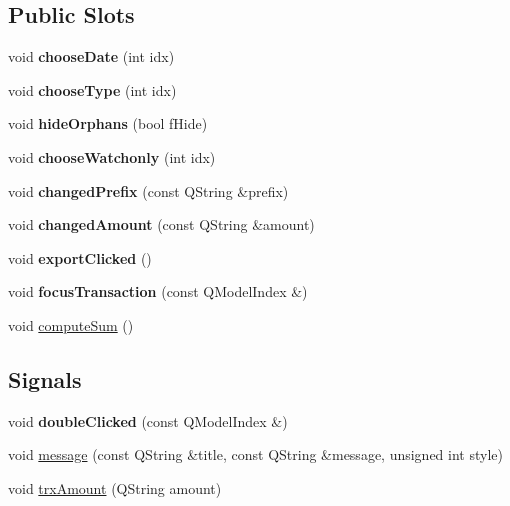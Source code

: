 \subsection*{Public Slots}
\begin{DoxyCompactItemize}
\item 
\mbox{\label{class_transaction_view_abd49a0777b14f7bf5a72a4d5901d033d}} 
void {\bfseries choose\+Date} (int idx)
\item 
\mbox{\label{class_transaction_view_a590f0edc4ab4d59f88d7fc494e852f80}} 
void {\bfseries choose\+Type} (int idx)
\item 
\mbox{\label{class_transaction_view_ab50fad53deb517f68926d62d2ff86a40}} 
void {\bfseries hide\+Orphans} (bool f\+Hide)
\item 
\mbox{\label{class_transaction_view_a0f3b9936adcb622403210e7b38a64574}} 
void {\bfseries choose\+Watchonly} (int idx)
\item 
\mbox{\label{class_transaction_view_ac2ed41556913e588c667490860717efa}} 
void {\bfseries changed\+Prefix} (const Q\+String \&prefix)
\item 
\mbox{\label{class_transaction_view_a0075048c06bb54da5c5e5d2691198984}} 
void {\bfseries changed\+Amount} (const Q\+String \&amount)
\item 
\mbox{\label{class_transaction_view_a5983022ff1e5395f87de3c5728eff8da}} 
void {\bfseries export\+Clicked} ()
\item 
\mbox{\label{class_transaction_view_ab6d126806467ae9dc273cbe19a7477cc}} 
void {\bfseries focus\+Transaction} (const Q\+Model\+Index \&)
\item 
void \mbox{\hyperlink{class_transaction_view_abb2ea48a61bb12a0dda9d63952adc50e}{compute\+Sum}} ()
\end{DoxyCompactItemize}
\subsection*{Signals}
\begin{DoxyCompactItemize}
\item 
\mbox{\label{class_transaction_view_ad7f18fdb4db9a4a307eeba8bf1fec4e3}} 
void {\bfseries double\+Clicked} (const Q\+Model\+Index \&)
\item 
void \mbox{\hyperlink{class_transaction_view_a56d909951088cfc74b8b18fc2693e3b1}{message}} (const Q\+String \&title, const Q\+String \&message, unsigned int style)
\item 
void \mbox{\hyperlink{class_transaction_view_a139ef5288ce13ce14c17907b4d80c0e8}{trx\+Amount}} (Q\+String amount)
\end{DoxyCompactItemize}
